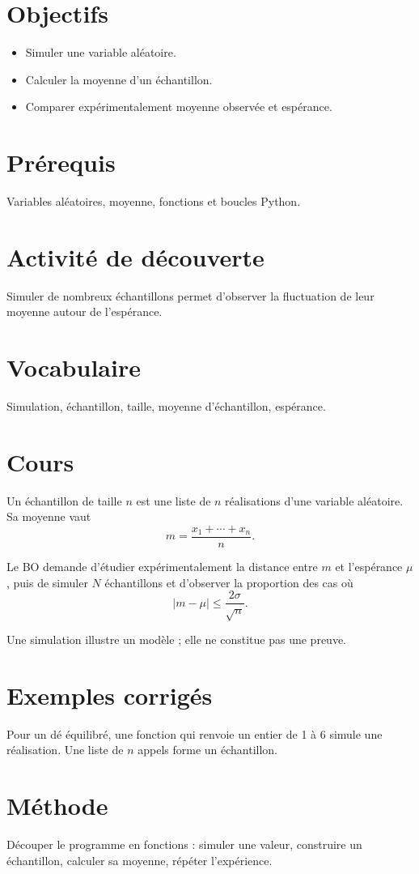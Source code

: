 \section{Objectifs}
\begin{itemize}
\item Simuler une variable aléatoire.
\item Calculer la moyenne d’un échantillon.
\item Comparer expérimentalement moyenne observée et espérance.
\end{itemize}

\section{Prérequis}
Variables aléatoires, moyenne, fonctions et boucles Python.

\section{Activité de découverte}
Simuler de nombreux échantillons permet d’observer la fluctuation de leur moyenne autour de l’espérance.

\section{Vocabulaire}
Simulation, échantillon, taille, moyenne d’échantillon, espérance.

\section{Cours}
Un échantillon de taille $n$ est une liste de $n$ réalisations d’une variable aléatoire. Sa moyenne vaut
\[
m=\frac{x_1+\cdots+x_n}{n}.
\]

Le BO demande d’étudier expérimentalement la distance entre $m$ et l’espérance $\mu$, puis de simuler $N$ échantillons et d’observer la proportion des cas où
\[
|m-\mu|\le \frac{2\sigma}{\sqrt n}.
\]

Une simulation illustre un modèle ; elle ne constitue pas une preuve.

\section{Exemples corrigés}
Pour un dé équilibré, une fonction qui renvoie un entier de 1 à 6 simule une réalisation. Une liste de $n$ appels forme un échantillon.

\section{Méthode}
Découper le programme en fonctions : simuler une valeur, construire un échantillon, calculer sa moyenne, répéter l’expérience.

